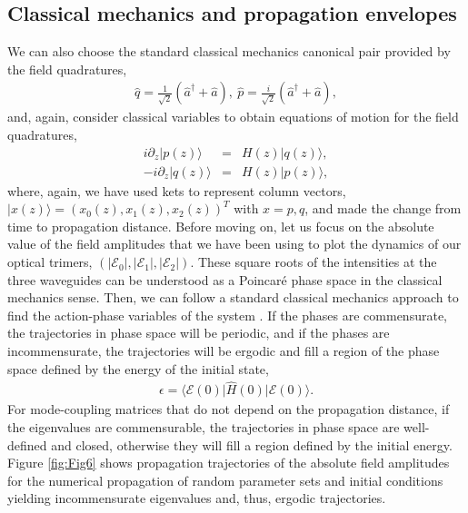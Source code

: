 \documentclass[9pt,twocolumn,twoside]{osajnl}
\begin{document}
\subsection{Classical mechanics and propagation envelopes }
We can also choose the standard classical mechanics canonical pair  provided by the field quadratures, 
\begin{eqnarray}
	\hat{q} = \frac{1}{\sqrt{2}} \left( \hat{a}^{\dagger} + \hat{a} \right), ~ 
	\hat{p} = \frac{i}{\sqrt{2}} \left( \hat{a}^{\dagger} + \hat{a} \right),
\end{eqnarray}
and, again, consider classical variables to obtain equations of motion for the field quadratures,
\begin{eqnarray}
	i \partial_z \vert p(z) \rangle	
	 &=&
	H(z) \vert q(z) \rangle , \\
-	i \partial_z \vert q(z) \rangle	 &=& 
    H(z)	\vert p(z) \rangle,
\end{eqnarray}
where, again, we have used kets to represent column vectors, $\vert x(z) \rangle = \left( x_{0}(z), x_{1}(z), x_{2}(z) \right)^{T}$ with $x=p,q$, and made the change from time to propagation distance.
Before moving on, let us focus on the absolute value of the field amplitudes that we have been using to plot the dynamics of our optical trimers, $(\vert \mathcal{E}_{0} \vert,\vert \mathcal{E}_{1} \vert,\vert \mathcal{E}_{2} \vert )$.
These square roots of the intensities at the three waveguides can be understood as a Poincar\'e phase space in the classical mechanics sense.
Then, we can follow a standard classical mechanics approach to find the action-phase variables of the system \cite{Goldstein1980}. 
If the phases are commensurate, the trajectories in phase space will be periodic, and if the phases are incommensurate, the trajectories will be ergodic and fill a region of the phase space defined by the energy of the initial state,
\begin{eqnarray}
\epsilon = \langle \mathcal{E}(0) \vert \hat{H}(0) \vert \mathcal{E}(0) \rangle.
\end{eqnarray}  
For mode-coupling matrices that do not depend on the propagation distance, if the eigenvalues are commensurable, the trajectories in phase space are well-defined and closed, otherwise they will fill a region defined by the initial energy.
Figure \ref{fig:Fig6} shows propagation trajectories of the absolute field amplitudes for the numerical propagation of random parameter sets and initial conditions yielding incommensurate eigenvalues and, thus, ergodic trajectories.
\end{document}
